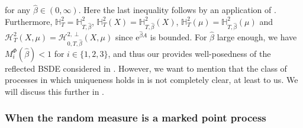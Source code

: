 \documentclass[10pt]{article} %
\newcommand\cH{\mathcal H}
\def \H{\mathbb{H}}
\newcommand{\1}{\mathbf{1}}
\begin{document}
for any $\hat\beta \in (0,\infty)$. Here the last inequality follows by an application of . Furthermore, $\H^2_{T} = \H^2_{T,\hat\beta}$, $\H^2_{T}(X) = \H^2_{T,\hat\beta}(X)$, $\H^2_{T}(\mu) = \H^2_{T,\hat\beta}(\mu)$ and $\cH^2_{T}(X,\mu) = \cH^{2,\perp}_{0,T,\hat\beta}(X,\mu)$ since $\mathrm{e}^{\hat\beta A}$ is bounded. For $\hat\beta$ large enough, we have $M^\Phi_i(\hat\beta) < 1$ for $i \in \{1,2,3\}$, and thus our  provides well-posedness of the reflected BSDE considered in \cite{grigorova2017reflected,grigorova2020optimal}. However, we want to mention that the class of processes in which uniqueness holds in \cite{grigorova2020optimal} is not completely clear, at least to us. We will discuss this further in . 




\subsubsection{When the random measure is a marked point process}
\end{document}
